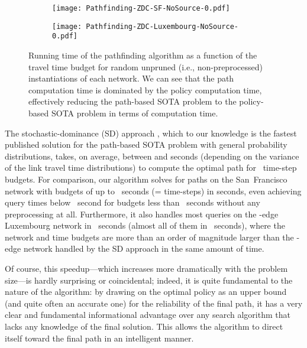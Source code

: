 \documentclass[oribibl]{llncs}
\begin{document}
			\begin{figure}[h]
				\centering
				\begin{subfigure}{0.48\textwidth}
					\centering
					\texttt{[image: Pathfinding-ZDC-SF-NoSource-0.pdf]}
				\end{subfigure}
				\begin{subfigure}{0.448\textwidth}
					\centering
					\texttt{[image: Pathfinding-ZDC-Luxembourg-NoSource-0.pdf]}
				\end{subfigure}
				\caption
				{
					Running time of the pathfinding algorithm as a function of the travel time
					budget for random unpruned
					(i.e., non-preprocessed) instantiations of each network.
					We can see that the path computation time is dominated
					by the policy computation time, effectively
					reducing the path-based SOTA problem to the policy-based SOTA problem
					in terms of computation time.
				}
				\label{fig:Pathfinding-ZDC}
			\end{figure}

			The stochastic-dominance (SD) approach \cite*{nie2009shortest},
			which to our knowledge is the fastest published solution
			for the path-based SOTA problem with general probability distributions,
			takes, on average, between  and  seconds
			(depending on the variance of the link travel time distributions)
			to compute the optimal path for ~time-step budgets.
			For comparison, our algorithm solves for paths on the San~Francisco network with
			budgets of up to ~seconds (=  time-steps) in  seconds, even
			achieving query times below ~second for budgets less than ~seconds
			without any preprocessing at all.
			Furthermore, it also handles most queries on the -edge Luxembourg
			network in ~seconds (almost all of them in ~seconds),
			where the network and time budgets are more than an order of magnitude larger than the
			-edge network handled by the SD approach in the same amount of time.

			Of course, this speedup---which increases more dramatically with the problem size---is
			hardly surprising or coincidental; indeed, it is quite fundamental to the nature of the algorithm:
			by drawing on the optimal policy as an upper bound (and quite often an accurate one) for the reliability
			of the final path, it has a very clear and fundamental informational advantage over any search algorithm
			that lacks any knowledge of the final solution.
			This allows the algorithm to direct itself toward the final path in an intelligent manner.
\end{document}
